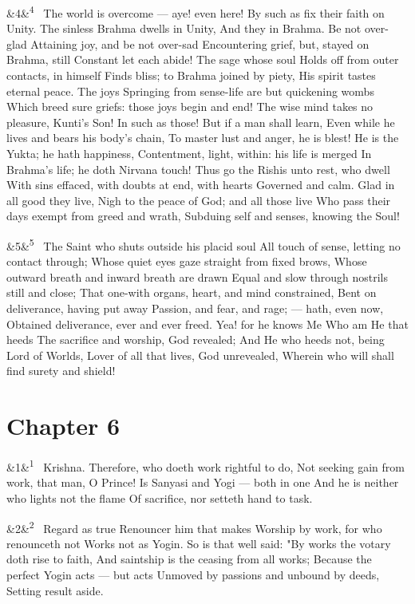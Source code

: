 \documentclass[12pt]{article}
\newcommand{\para}[1][]{\par\noindent\ifx&#1&\else\textsuperscript{\footnotesize #1}~\fi}
\begin{document}
\para[4] The world is overcome --- aye! even here! By such as fix their faith on Unity. The sinless Brahma dwells in Unity, And they in Brahma. Be not over-glad Attaining joy, and be not over-sad Encountering grief, but, stayed on Brahma, still Constant let each abide! The sage whose soul Holds off from outer contacts, in himself Finds bliss; to Brahma joined by piety, His spirit tastes eternal peace. The joys Springing from sense-life are but quickening wombs Which breed sure griefs: those joys begin and end! The wise mind takes no pleasure, Kunti's Son! In such as those! But if a man shall learn, Even while he lives and bears his body's chain, To master lust and anger, he is blest! He is the Yukta; he hath happiness, Contentment, light, within: his life is merged In Brahma's life; he doth Nirvana touch! Thus go the Rishis unto rest, who dwell With sins effaced, with doubts at end, with hearts Governed and calm. Glad in all good they live, Nigh to the peace of God; and all those live Who pass their days exempt from greed and wrath, Subduing self and senses, knowing the Soul!

\para[5] The Saint who shuts outside his placid soul All touch of sense, letting no contact through; Whose quiet eyes gaze straight from fixed brows, Whose outward breath and inward breath are drawn Equal and slow through nostrils still and close; That one-with organs, heart, and mind constrained, Bent on deliverance, having put away Passion, and fear, and rage; --- hath, even now, Obtained deliverance, ever and ever freed. Yea! for he knows Me Who am He that heeds The sacrifice and worship, God revealed; And He who heeds not, being Lord of Worlds, Lover of all that lives, God unrevealed, Wherein who will shall find surety and shield!

\section*{Chapter 6}

\para[1] Krishna. Therefore, who doeth work rightful to do, Not seeking gain from work, that man, O Prince! Is Sanyasi and Yogi --- both in one And he is neither who lights not the flame Of sacrifice, nor setteth hand to task.

\para[2] Regard as true Renouncer him that makes Worship by work, for who renounceth not Works not as Yogin. So is that well said: "By works the votary doth rise to faith, And saintship is the ceasing from all works; Because the perfect Yogin acts --- but acts Unmoved by passions and unbound by deeds, Setting result aside.
\end{document}
